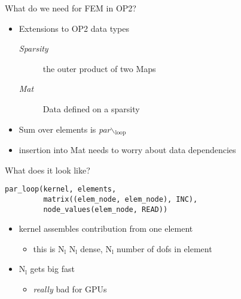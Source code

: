 \documentclass[bigger]{beamer}
\begin{document}
\begin{frame}[label={sec:orgheadline17}]{What do we need for FEM in OP2?}
\begin{itemize}
\item Extensions to OP2 data types
\begin{description}
\item[{\emph{Sparsity}}] the outer product of two Maps
\item[{\emph{Mat}}] Data defined on a sparsity
\end{description}
\item Sum over elements is \emph{par$\backslash$\(_{\text{loop}}\)}
\item insertion into Mat needs to worry about data dependencies
\end{itemize}
\end{frame}

\begin{frame}[fragile,label={sec:orgheadline18}]{What does it look like?}
 \begin{verbatim}
par_loop(kernel, elements,
         matrix((elem_node, elem_node), INC),
         node_values(elem_node, READ))
\end{verbatim}

\begin{itemize}
\item kernel assembles contribution from one element
\begin{itemize}
\item this is N\(_{\text{l}}\) \texttimes{} N\(_{\text{l}}\) dense, N\(_{\text{l}}\) number of dofs in element
\end{itemize}
\item N\(_{\text{l}}\) gets big fast
\begin{itemize}
\item \emph{really} bad for GPUs
\end{itemize}
\end{itemize}
\end{frame}
\end{document}
